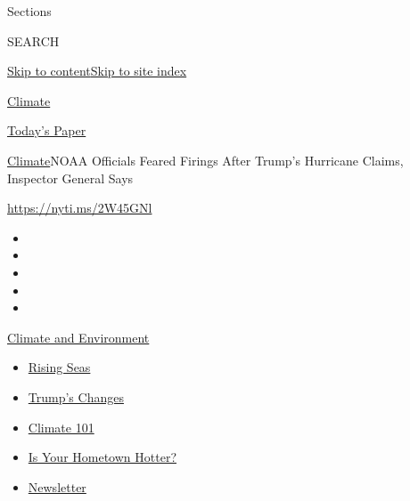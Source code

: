 Sections

SEARCH

\protect\hyperlink{site-content}{Skip to
content}\protect\hyperlink{site-index}{Skip to site index}

\href{https://www.nytimes3xbfgragh.onion/section/climate}{Climate}

\href{https://myaccount.nytimes3xbfgragh.onion/auth/login?response_type=cookie\&client_id=vi}{}

\href{https://www.nytimes3xbfgragh.onion/section/todayspaper}{Today's
Paper}

\href{/section/climate}{Climate}\textbar{}NOAA Officials Feared Firings
After Trump's Hurricane Claims, Inspector General Says

\url{https://nyti.ms/2W45GNl}

\begin{itemize}
\item
\item
\item
\item
\item
\end{itemize}

\href{https://www.nytimes3xbfgragh.onion/section/climate?action=click\&pgtype=Article\&state=default\&region=TOP_BANNER\&context=storylines_menu}{Climate
and Environment}

\begin{itemize}
\tightlist
\item
  \href{https://www.nytimes3xbfgragh.onion/2020/07/30/climate/sea-level-inland-floods.html?action=click\&pgtype=Article\&state=default\&region=TOP_BANNER\&context=storylines_menu}{Rising
  Seas}
\item
  \href{https://www.nytimes3xbfgragh.onion/interactive/2020/climate/trump-environment-rollbacks.html?action=click\&pgtype=Article\&state=default\&region=TOP_BANNER\&context=storylines_menu}{Trump's
  Changes}
\item
  \href{https://www.nytimes3xbfgragh.onion/interactive/2020/04/19/climate/climate-crash-course-1.html?action=click\&pgtype=Article\&state=default\&region=TOP_BANNER\&context=storylines_menu}{Climate
  101}
\item
  \href{https://www.nytimes3xbfgragh.onion/interactive/2018/08/30/climate/how-much-hotter-is-your-hometown.html?action=click\&pgtype=Article\&state=default\&region=TOP_BANNER\&context=storylines_menu}{Is
  Your Hometown Hotter?}
\item
  \href{https://www.nytimes3xbfgragh.onion/newsletters/climate-change?action=click\&pgtype=Article\&state=default\&region=TOP_BANNER\&context=storylines_menu}{Newsletter}
\end{itemize}


